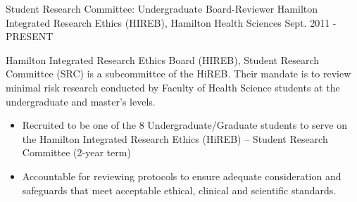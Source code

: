 
\begin{cventries}

  \cventry
    {Student Research Committee: Undergraduate Board-Reviewer} %
    {Hamilton Integrated Research Ethics (HIREB), } %
    {Hamilton Health Sciences} %
    {Sept. 2011 - PRESENT} %
     {\renewcommand{\labelitemii}{\bullet}
      \begin{cvitems}%
        \item[] {Hamilton Integrated Research Ethics Board (HIREB), Student Research Committee (SRC) is a subcommittee of the HiREB.  Their mandate is to review minimal risk research conducted by Faculty of Health Science students at the undergraduate and master’s levels.}
        \begin{itemize} 
        \item {Recruited to be one of the 8 Undergraduate/Graduate students to serve on the Hamilton Integrated Research Ethics (HiREB) – Student Research Committee (2-year term)}
        \item {Accountable for reviewing protocols to ensure adequate consideration and safeguards that meet acceptable ethical, clinical and scientific standards.}
        \end{itemize}
      \end{cvitems}
    }




\end{cventries}
